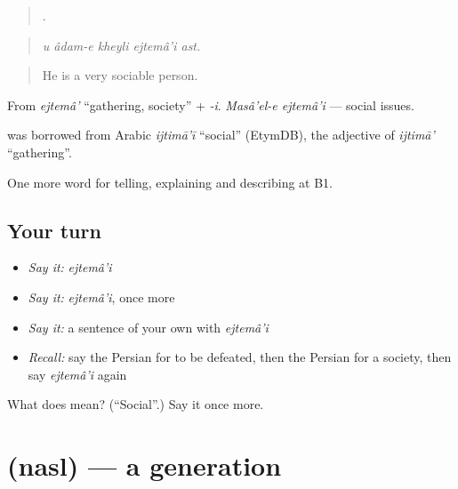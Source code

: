 \begin{quote}
    .
\end{quote}

\begin{quote}
\emph{u âdam-e kheyli ejtemâ'i ast.}
\end{quote}

\begin{quote}
He is a very sociable person.
\end{quote}

From \emph{ejtemâ'} \textquotedblleft{}gathering, society\textquotedblright{} + \emph{-i}. \emph{Masâ'el-e ejtemâ'i} — social issues.

\begin{cousinweb}
\textbf{} was borrowed from Arabic \emph{ijtimā'ī} \textquotedblleft{}social\textquotedblright{} (EtymDB), the adjective of \emph{ijtimā'} \textquotedblleft{}gathering\textquotedblright{}.
\end{cousinweb}

\begin{grammarlens}[title={What you've built}]
One more word for telling, explaining and describing at B1.
\end{grammarlens}

\subsection*{Your turn}
\begin{itemize}
\raggedright
  \item \emph{Say it:} \emph{ejtemâ'i}
  \item \emph{Say it:} \emph{ejtemâ'i}, once more
  \item \emph{Say it:} a sentence of your own with \emph{ejtemâ'i}
  \item \emph{Recall:} say the Persian for to be defeated, then the Persian for a society, then say \emph{ejtemâ'i} again
\end{itemize}

\begin{tcolorbox}[breakable,colback=teal!4,colframe=teal!35!black,title={Before you move on}]
What does  mean? (\textquotedblleft{}Social\textquotedblright{}.) Say it once more.
\end{tcolorbox}
\section[\texorpdfstring{\fa{نسل} (nasl)}{نسل (nasl)}]{ (nasl) — a generation}

